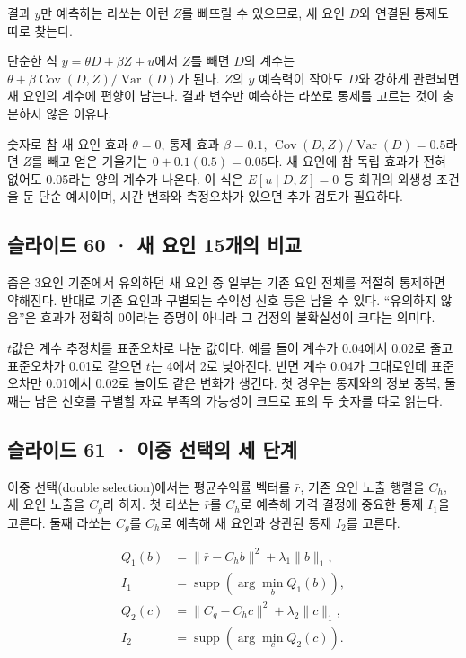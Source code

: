 \documentclass[11pt,a4paper]{article}
\begin{document}
결과 $y$만 예측하는 라쏘는 이런 $Z$를 빠뜨릴 수 있으므로, 새 요인 $D$와 연결된 통제도 따로 찾는다.\par

단순한 식 $y=\theta D+\beta Z+u$에서 $Z$를 빼면 $D$의 계수는 $\theta+\beta\operatorname{Cov}(D,Z)/\operatorname{Var}(D)$가 된다. $Z$의 $y$ 예측력이 작아도 $D$와 강하게 관련되면 새 요인의 계수에 편향이 남는다. 결과 변수만 예측하는 라쏘로 통제를 고르는 것이 충분하지 않은 이유다.\par

숫자로 참 새 요인 효과 $\theta=0$, 통제 효과 $\beta=0.1$, $\operatorname{Cov}(D,Z)/\operatorname{Var}(D)=0.5$라면 $Z$를 빼고 얻은 기울기는 $0+0.1(0.5)=0.05$다. 새 요인에 참 독립 효과가 전혀 없어도 0.05라는 양의 계수가 나온다. 이 식은 $E[u\mid D,Z]=0$ 등 회귀의 외생성 조건을 둔 단순 예시이며, 시간 변화와 측정오차가 있으면 추가 검토가 필요하다.\par

\subsection{슬라이드 60 · 새 요인 15개의 비교}
좁은 3요인 기준에서 유의하던 새 요인 중 일부는 기존 요인 전체를 적절히 통제하면 약해진다. 반대로 기존 요인과 구별되는 수익성 신호 등은 남을 수 있다. “유의하지 않음”은 효과가 정확히 0이라는 증명이 아니라 그 검정의 불확실성이 크다는 의미다.\par

$t$값은 계수 추정치를 표준오차로 나눈 값이다. 예를 들어 계수가 0.04에서 0.02로 줄고 표준오차가 0.01로 같으면 $t$는 4에서 2로 낮아진다. 반면 계수 0.04가 그대로인데 표준오차만 0.01에서 0.02로 늘어도 같은 변화가 생긴다. 첫 경우는 통제와의 정보 중복, 둘째는 남은 신호를 구별할 자료 부족의 가능성이 크므로 표의 두 숫자를 따로 읽는다.\par

\subsection{슬라이드 61 · 이중 선택의 세 단계}
이중 선택(double selection)에서는 평균수익률 벡터를 $\bar r$, 기존 요인 노출 행렬을 $C_h$, 새 요인 노출을 $C_g$라 하자. 첫 라쏘는 $\bar r$를 $C_h$로 예측해 가격 결정에 중요한 통제 $I_1$을 고른다. 둘째 라쏘는 $C_g$를 $C_h$로 예측해 새 요인과 상관된 통제 $I_2$를 고른다.\par

\[
\begin{aligned}
Q_1(b)&=\|\bar r-C_hb\|^2+\lambda_1\|b\|_1,\\
I_1&=\operatorname{supp}(\arg\min_b Q_1(b)),\\
Q_2(c)&=\|C_g-C_hc\|^2+\lambda_2\|c\|_1,\\
I_2&=\operatorname{supp}(\arg\min_c Q_2(c)).
\end{aligned}
\]
\end{document}
